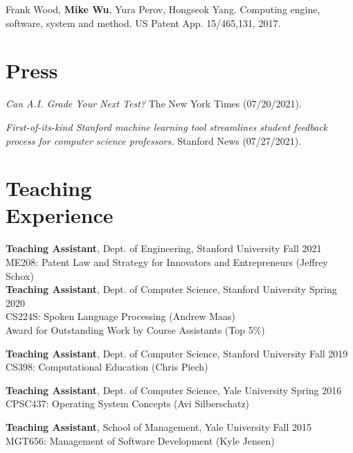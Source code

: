 \documentclass[margin, 10pt]{res} %
\begin{document}
\begin{resume}
Frank Wood, \textbf{Mike Wu}, Yura Perov, Hongseok Yang. Computing engine, software, system and method. US Patent App. 15/465,131, 2017.


\section{Press}

\textit{Can A.I. Grade Your Next Test?} The New York Times (07/20/2021).

\textit{First-of-its-kind Stanford machine learning tool streamlines student feedback process for computer science professors.} Stanford News (07/27/2021).


\section{Teaching \\ Experience}

\textbf{Teaching Assistant}, Dept. of Engineering, Stanford University \hfill Fall 2021\\
ME208: Patent Law and Strategy for Innovators and Entrepreneurs (Jeffrey Schox)\\

\textbf{Teaching Assistant}, Dept. of Computer Science, Stanford University \hfill Spring 2020\\
CS224S: Spoken Language Processing (Andrew Maas)\\
Award for Outstanding Work by Course Assistants (Top 5\%)

\textbf{Teaching Assistant}, Dept. of Computer Science, Stanford University \hfill Fall 2019\\
CS398: Computational Education (Chris Piech)

\textbf{Teaching Assistant}, Dept. of Computer Science, Yale University \hfill Spring 2016\\
CPSC437: Operating System Concepts (Avi Silberschatz)

\textbf{Teaching Assistant}, School of Management, Yale University \hfill Fall 2015\\
MGT656: Management of Software Development (Kyle Jensen)


\end{resume}
\end{document}
